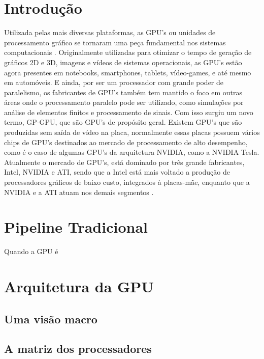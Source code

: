 \documentclass[a4paper, 12pt]{article}
\begin{document}
\section{Introdução}
Utilizada pelas mais diversas plataformas, as GPU's ou unidades de processamento gráfico se tornaram uma peça fundamental nos sistemas computacionais \cite{owens2008gpu}. Originalmente utilizadas para otimizar o tempo de geração de gráficos 2D e 3D, imagens e vídeos de sistemas operacionais, as GPU's estão agora presentes em notebooks, smartphones, tablets, vídeo-games, e até mesmo em automóveis. E ainda, por ser um processador com grande poder de paralelismo, os fabricantes de GPU's também tem mantido o foco em outras áreas onde o processamento paralelo pode ser utilizado, como simulações por análise de elementos finitos e processamento de sinais. Com isso surgiu um novo termo, GP-GPU, que são GPU's de propósito geral. Existem GPU's que são produzidas sem saída de vídeo na placa, normalmente essas placas possuem vários chips de GPU's
destinados ao mercado de processamento de alto desempenho, como é o caso de algumas GPU's da arquitetura NVIDIA, como a NVIDIA Tesla. Atualmente o mercado de GPU's, está dominado por três grande fabricantes, Intel, NVIDIA e ATI, sendo que a Intel está mais voltado a produção de processadores gráficos de baixo custo, integrados à placas-mãe, enquanto que a NVIDIA e a ATI atuam nos demais segmentos \cite{machado}.

\section{Pipeline Tradicional}
Quando a GPU é 

\section{Arquitetura da GPU}

\subsection{Uma visão macro}

\subsection{A matriz dos processadores}


  
  
\end{document}
